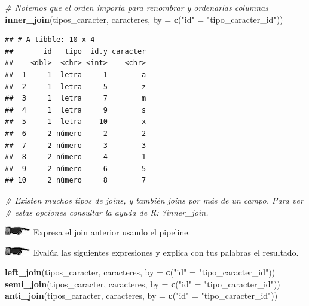 \documentclass[]{book}
\newenvironment{Shaded}{\begin{snugshade}}{\end{snugshade}}
\newcommand{\KeywordTok}[1]{\textcolor[rgb]{0.13,0.29,0.53}{\textbf{#1}}}
\newcommand{\DataTypeTok}[1]{\textcolor[rgb]{0.13,0.29,0.53}{#1}}
\newcommand{\StringTok}[1]{\textcolor[rgb]{0.31,0.60,0.02}{#1}}
\newcommand{\CommentTok}[1]{\textcolor[rgb]{0.56,0.35,0.01}{\textit{#1}}}
\newcommand{\NormalTok}[1]{#1}
\theoremstyle{definition}
\theoremstyle{definition}
\theoremstyle{definition}
\theoremstyle{remark}
\begin{document}
\begin{Shaded}
\begin{Highlighting}[]
\CommentTok{# Notemos que el orden importa para renombrar y ordenarlas columnas}
\KeywordTok{inner_join}\NormalTok{(tipos_caracter, caracteres, }\DataTypeTok{by =} \KeywordTok{c}\NormalTok{(}\StringTok{"id"}\NormalTok{ =}\StringTok{ "tipo_caracter_id"}\NormalTok{))}
\end{Highlighting}
\end{Shaded}

\begin{verbatim}
## # A tibble: 10 x 4
##       id   tipo  id.y caracter
##    <dbl>  <chr> <int>    <chr>
##  1     1  letra     1        a
##  2     1  letra     5        z
##  3     1  letra     7        m
##  4     1  letra     9        s
##  5     1  letra    10        x
##  6     2 número     2        2
##  7     2 número     3        3
##  8     2 número     4        1
##  9     2 número     6        5
## 10     2 número     8        7
\end{verbatim}

\begin{Shaded}
\begin{Highlighting}[]
\CommentTok{# Existen muchos tipos de joins, y también joins por más de un campo. Para ver}
\CommentTok{# estas opciones consultar la ayuda de R: ?inner_join.}
\end{Highlighting}
\end{Shaded}

\includegraphics{./imagenes/manicule2.jpg} Expresa el join anterior
usando el pipeline.

\includegraphics{./imagenes/manicule2.jpg} Evalúa las siguientes
expresiones y explica con tus palabras el resultado.

\begin{Shaded}
\begin{Highlighting}[]
\KeywordTok{left_join}\NormalTok{(tipos_caracter, caracteres, }\DataTypeTok{by =} \KeywordTok{c}\NormalTok{(}\StringTok{"id"}\NormalTok{ =}\StringTok{ "tipo_caracter_id"}\NormalTok{))}
\KeywordTok{semi_join}\NormalTok{(tipos_caracter, caracteres, }\DataTypeTok{by =} \KeywordTok{c}\NormalTok{(}\StringTok{"id"}\NormalTok{ =}\StringTok{ "tipo_caracter_id"}\NormalTok{))}
\KeywordTok{anti_join}\NormalTok{(tipos_caracter, caracteres, }\DataTypeTok{by =} \KeywordTok{c}\NormalTok{(}\StringTok{"id"}\NormalTok{ =}\StringTok{ "tipo_caracter_id"}\NormalTok{))}
\end{Highlighting}
\end{Shaded}
\end{document}
